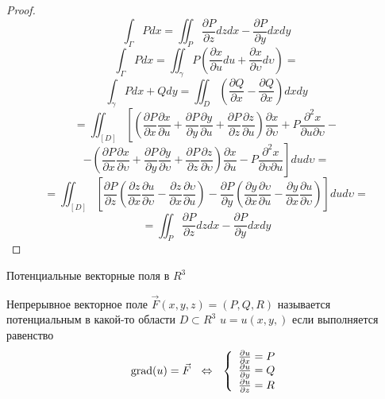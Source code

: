 \begin{proof}
  $$
  \int_{\Gamma} P dx = \iint_P
    \frac{\partial P}{\partial z} dz dx
    -
    \frac{\partial P}{\partial y} dx dy
  $$
  $$
  \int_{\Gamma} P dx = \iint_{\gamma}
    P
    \left(
      \frac{\partial x}{\partial u} du
      +
      \frac{\partial x}{\partial \upsilon} d\upsilon
    \right)
  =
  $$
  $$
  \int_{\gamma} Pdx + Qdy = \iint_D
    \left(
      \frac{\partial Q}{\partial x}
      -
      \frac{\partial Q}{\partial x}
    \right)
    dx dy
  $$
  $$
  = \iint_{[D]}
    \left[
      \left(
        \frac{\partial P}{\partial x}
        \frac{\partial x}{\partial u}
        +
        \frac{\partial P}{\partial y}
        \frac{\partial y}{\partial u}
        +
        \frac{\partial P}{\partial z}
        \frac{\partial z}{\partial u}
      \right)
      \frac{\partial x}{\partial \upsilon}
      +
      P \frac{\partial^2 x}{\partial u \partial \upsilon}
    \right.
    -
  $$
  $$
    \left.
      -
      \left(
        \frac{\partial P}{\partial x}
        \frac{\partial x}{\partial \upsilon}
        +
        \frac{\partial P}{\partial y}
        \frac{\partial y}{\partial \upsilon}
        +
        \frac{\partial P}{\partial z}
        \frac{\partial z}{\partial \upsilon}
      \right)
      \frac{\partial x}{\partial u}
      -
      P \frac{\partial^2 x}{\partial \upsilon \partial u}
    \right]
    du d\upsilon
  =
  $$
  $$
  = \iint_{[D]}
    \left[
      \frac{\partial P}{\partial z}
      \left(
        \frac{\partial z}{\partial x}
        \frac{\partial u}{\partial \upsilon}
        -
        \frac{\partial z}{\partial x}
        \frac{\partial \upsilon}{\partial u}
      \right)
      -
      \frac{\partial P}{\partial y}
      \left(
        \frac{\partial y}{\partial x}
        \frac{\partial \upsilon}{\partial u}
        -
        \frac{\partial y}{\partial x}
        \frac{\partial u}{\partial \upsilon}
      \right)
    \right]
    du d\upsilon =
  $$
  $$
  = \iint_P
    \frac{\partial P}{\partial z} dz dx
    -
    \frac{\partial P}{\partial y} dx dy
  $$
\end{proof}

\begin{title}[\Large]
  Потенциальные векторные поля в $R^3$
\end{title}

\begin{define}
  Непрерывное векторное поле $\vec F(x,y,z) = (P, Q, R)$ называется
  потенциальным в какой-то области $D \subset R^3$ $u = u(x,y,)$ если
  выполняется равенство
  $$
  \mathrm{grad} (u) = \vec F ~~ \Leftrightarrow ~~
  \left\{
  \begin{array}{l}
    \frac{\partial u}{\partial x} = P \\
    \frac{\partial u}{\partial y} = Q \\
    \frac{\partial u}{\partial z} = R
  \end{array}
  \right.
  $$
\end{define}

